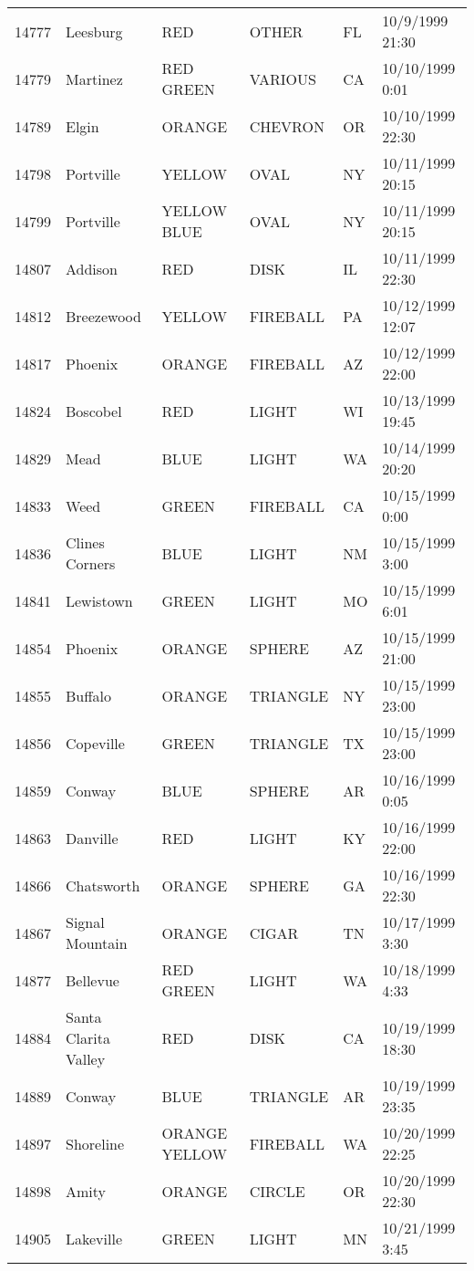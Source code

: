 \begin{tabular}{llllll}
14777 & Leesburg & RED & OTHER & FL & 10/9/1999 21:30 \\
14779 & Martinez & RED GREEN & VARIOUS & CA & 10/10/1999 0:01 \\
14789 & Elgin & ORANGE & CHEVRON & OR & 10/10/1999 22:30 \\
14798 & Portville & YELLOW & OVAL & NY & 10/11/1999 20:15 \\
14799 & Portville & YELLOW BLUE & OVAL & NY & 10/11/1999 20:15 \\
14807 & Addison & RED & DISK & IL & 10/11/1999 22:30 \\
14812 & Breezewood & YELLOW & FIREBALL & PA & 10/12/1999 12:07 \\
14817 & Phoenix & ORANGE & FIREBALL & AZ & 10/12/1999 22:00 \\
14824 & Boscobel & RED & LIGHT & WI & 10/13/1999 19:45 \\
14829 & Mead & BLUE & LIGHT & WA & 10/14/1999 20:20 \\
14833 & Weed & GREEN & FIREBALL & CA & 10/15/1999 0:00 \\
14836 & Clines Corners & BLUE & LIGHT & NM & 10/15/1999 3:00 \\
14841 & Lewistown & GREEN & LIGHT & MO & 10/15/1999 6:01 \\
14854 & Phoenix & ORANGE & SPHERE & AZ & 10/15/1999 21:00 \\
14855 & Buffalo & ORANGE & TRIANGLE & NY & 10/15/1999 23:00 \\
14856 & Copeville & GREEN & TRIANGLE & TX & 10/15/1999 23:00 \\
14859 & Conway & BLUE & SPHERE & AR & 10/16/1999 0:05 \\
14863 & Danville & RED & LIGHT & KY & 10/16/1999 22:00 \\
14866 & Chatsworth & ORANGE & SPHERE & GA & 10/16/1999 22:30 \\
14867 & Signal Mountain & ORANGE & CIGAR & TN & 10/17/1999 3:30 \\
14877 & Bellevue & RED GREEN & LIGHT & WA & 10/18/1999 4:33 \\
14884 & Santa Clarita Valley & RED & DISK & CA & 10/19/1999 18:30 \\
14889 & Conway & BLUE & TRIANGLE & AR & 10/19/1999 23:35 \\
14897 & Shoreline & ORANGE YELLOW & FIREBALL & WA & 10/20/1999 22:25 \\
14898 & Amity & ORANGE & CIRCLE & OR & 10/20/1999 22:30 \\
14905 & Lakeville & GREEN & LIGHT & MN & 10/21/1999 3:45 \\

\end{tabular}
